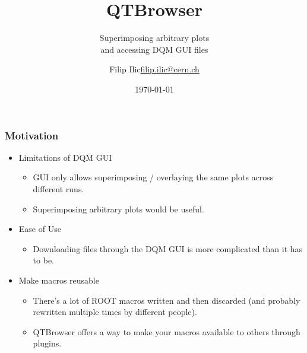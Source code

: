 \documentclass{beamer}
\title{QTBrowser}
\subtitle{Superimposing arbitrary plots \\and accessing DQM GUI files}
\author{\texorpdfstring{Filip Ilic\newline\url{filip.ilic@cern.ch}}{Filip ilic}}
\date{\today}
\begin{document}
\maketitle

\begin{frame}
  \frametitle{Motivation}
	
	\begin{itemize}
\item<1-> Limitations of DQM GUI
    \begin{itemize}
        \item GUI only allows superimposing / overlaying the same plots across different runs.
        \item Superimposing arbitrary plots would be useful.
    \end{itemize}
    
\item Ease of Use
    \begin{itemize}
        \item Downloading files through the DQM GUI is more complicated than it has to be.
    \end{itemize}
\item Make macros reusable
	\begin{itemize}
	\item There's a lot of ROOT macros written and then discarded (and probably rewritten multiple times by different people).
	\item QTBrowser offers a way to make your macros available to others through plugins.
	\end{itemize}	
\end{itemize}
\end{frame}
\end{document}

